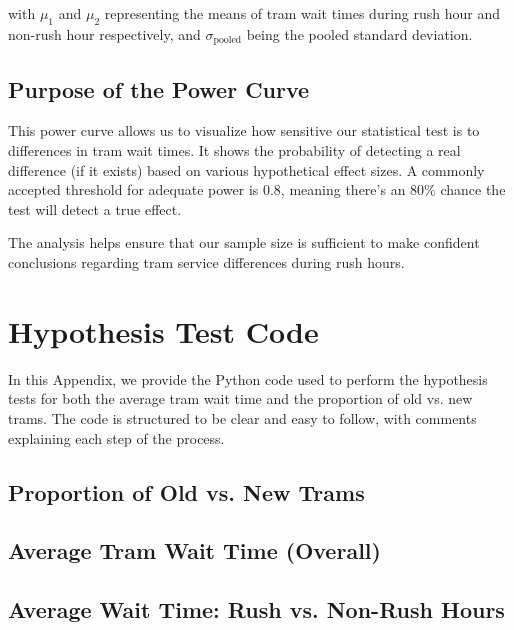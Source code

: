 \documentclass[a4paper, 10pt]{article}
\begin{document}
\begin{appendices}
				with \( \mu_1 \) and \( \mu_2 \) representing the means of tram wait times during rush hour and non-rush hour respectively, and \( \sigma_{\text{pooled}} \) being the pooled standard deviation.

			\subsection*{Purpose of the Power Curve}

				This power curve allows us to visualize how sensitive our statistical test is to differences in tram wait times. It shows the probability of detecting a real difference (if it exists) based on various hypothetical effect sizes. A commonly accepted threshold for adequate power is 0.8, meaning there's an 80\% chance the test will detect a true effect.

				\bigskip
				The analysis helps ensure that our sample size is sufficient to make confident conclusions regarding tram service differences during rush hours.
		

		\newpage
		\section{Hypothesis Test Code}
		\label{sec:hypothesis_test_code}
		  \noindent In this Appendix, we provide the Python code used to perform the hypothesis tests for both the average tram wait time and the proportion of old vs. new trams. The code is structured to be clear and easy to follow, with comments explaining each step of the process.

			\subsection*{Proportion of Old vs. New Trams}
					

			\newpage
			\subsection*{Average Tram Wait Time (Overall)}
				

			\newpage
			\subsection*{Average Wait Time: Rush vs. Non-Rush Hours}
				
	\end{appendices}
\end{document}
